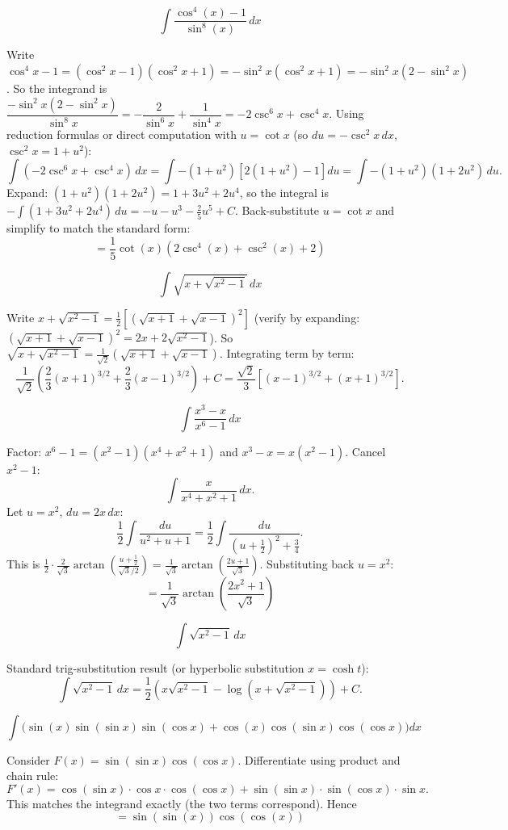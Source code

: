 \begin{questions}
\question
\[ \int \frac{\cos^4(x)-1}{\sin^8(x)}\,dx \]
\begin{solution}
Write $\cos^4x-1=(\cos^2x-1)(\cos^2x+1)=-\sin^2x(\cos^2x+1)=-\sin^2x(2-\sin^2x)$.
So the integrand is $\dfrac{-\sin^2x(2-\sin^2x)}{\sin^8x} = -\dfrac{2}{\sin^6x}+\dfrac{1}{\sin^4x} = -2\csc^6x+\csc^4x$.
Using reduction formulas or direct computation with $u=\cot x$ (so $du=-\csc^2x\,dx$, $\csc^2x=1+u^2$):
\[ \int(-2\csc^6x+\csc^4x)\,dx = \int -(1+u^2)\left[2(1+u^2)-1\right]du = \int-(1+u^2)(1+2u^2)\,du.\]
Expand: $(1+u^2)(1+2u^2)=1+3u^2+2u^4$, so the integral is $-\int(1+3u^2+2u^4)\,du = -u-u^3-\tfrac{2}{5}u^5+C$.
Back-substitute $u=\cot x$ and simplify to match the standard form:
\[ = \frac15\cot(x)\left(2\csc^4(x)+\csc^2(x)+2\right) \]
\end{solution}

\question
\[ \int \sqrt{x+\sqrt{x^2-1}}\,dx \]
\begin{solution}
Write $x+\sqrt{x^2-1}=\tfrac12\left[(\sqrt{x+1}+\sqrt{x-1})^2\right]$ (verify by expanding: $(\sqrt{x+1}+\sqrt{x-1})^2=2x+2\sqrt{x^2-1}$).
So $\sqrt{x+\sqrt{x^2-1}}=\tfrac{1}{\sqrt2}\left(\sqrt{x+1}+\sqrt{x-1}\right)$.
Integrating term by term:
\[ \frac{1}{\sqrt2}\left(\frac23(x+1)^{3/2}+\frac23(x-1)^{3/2}\right)+C = \frac{\sqrt2}{3}\left[(x-1)^{3/2}+(x+1)^{3/2}\right]. \]
\end{solution}

\question
\[ \int \frac{x^3-x}{x^6-1}\,dx \]
\begin{solution}
Factor: $x^6-1=(x^2-1)(x^4+x^2+1)$ and $x^3-x=x(x^2-1)$. Cancel $x^2-1$:
\[ \int \frac{x}{x^4+x^2+1}\,dx. \]
Let $u=x^2$, $du=2x\,dx$:
\[ \frac12\int\frac{du}{u^2+u+1}=\frac12\int\frac{du}{(u+\tfrac12)^2+\tfrac34}. \]
This is $\frac12\cdot\frac{2}{\sqrt3}\arctan\left(\frac{u+\tfrac12}{\sqrt3/2}\right)=\frac{1}{\sqrt3}\arctan\left(\frac{2u+1}{\sqrt3}\right)$. Substituting back $u=x^2$:
\[ = \frac{1}{\sqrt3}\arctan\left(\frac{2x^2+1}{\sqrt3}\right) \]
\end{solution}

\question
\[ \int \sqrt{x^2-1}\,dx \]
\begin{solution}
Standard trig-substitution result (or hyperbolic substitution $x=\cosh t$):
\[ \int\sqrt{x^2-1}\,dx = \frac12\left(x\sqrt{x^2-1}-\log\left(x+\sqrt{x^2-1}\right)\right)+C. \]
\end{solution}

\question
\[ \int \Big(\sin(x)\sin(\sin x)\sin(\cos x)+\cos(x)\cos(\sin x)\cos(\cos x)\Big)dx \]
\begin{solution}
Consider $F(x)=\sin(\sin x)\cos(\cos x)$. Differentiate using product and chain rule:
\[ F'(x) = \cos(\sin x)\cdot\cos x\cdot\cos(\cos x) + \sin(\sin x)\cdot\sin(\cos x)\cdot\sin x. \]
This matches the integrand exactly (the two terms correspond). Hence
\[ = \sin(\sin(x))\cos(\cos(x)) \]
\end{solution}


\end{questions}

